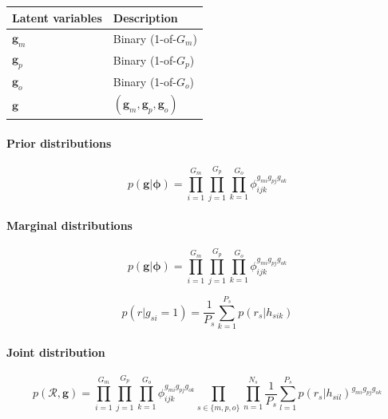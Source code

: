 \documentclass{article}
\begin{document}
\begin{center}
\begin{tabular}{ll}
Latent variables & Description \\
\hline
$\boldsymbol{g}_m$ & Binary (1-of-$G_m$) \\
$\boldsymbol{g}_p$ & Binary (1-of-$G_p$) \\
$\boldsymbol{g}_o$ & Binary (1-of-$G_o$) \\
$\boldsymbol{g}$ & $(\boldsymbol{g}_m, \boldsymbol{g}_p, \boldsymbol{g}_o)$ \\
\hline
\end{tabular}
\end{center}

\paragraph{Prior distributions}

\begin{equation}
    p(\boldsymbol{g} | \boldsymbol{\phi}) = \prod_{i = 1}^{G_m}\prod_{j = 1}^{G_p}\prod_{k = 1}^{G_o} \phi_{ijk}^{g_{mi} g_{pj} g_{ok}}
\end{equation}

\paragraph{Marginal distributions}

\begin{equation}
 p(\boldsymbol{g} | \boldsymbol{\phi}) = \prod_{i = 1}^{G_m}\prod_{j = 1}^{G_p}\prod_{k = 1}^{G_o} \phi_{ijk}^{g_{mi} g_{pj} g_{ok}}
\end{equation}

\begin{equation}
 p(r | g_{si} = 1) = \frac{1}{P_s} \sum^{P_s}_{k = 1} p(r_s | h_{sik})
\end{equation}

\paragraph{Joint distribution}

\begin{equation}
 p(\mathcal{R}, \boldsymbol{g}) = \prod_{i = 1}^{G_m}\prod_{j = 1}^{G_p}\prod_{k = 1}^{G_o} \phi_{ijk}^{g_{mi} g_{pj} g_{ok}} \prod_{s \in \{m, p, o \}} \prod^{N_s}_{n = 1} \frac{1}{P_s} \sum^{P_s}_{l = 1} p(r_s | h_{sil})^{g_{mi} g_{pj} g_{ok}}
\end{equation}
\end{document}
